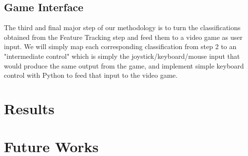 \documentclass[10pt,twocolumn,letterpaper]{article}
\begin{document}
\subsection{Game Interface}
The third and final major step of our methodology is to turn the classifications obtained from 
the Feature Tracking step and feed them to a video game as user input. We will simply map each 
corresponding classification from step 2 to an "intermediate control" which is simply the 
joystick/keyboard/mouse input that would produce the same output from the game, and implement 
simple keyboard control with Python to feed that input to the video game.

\section{Results}

\section{Future Works}

{\small


}
\end{document}
